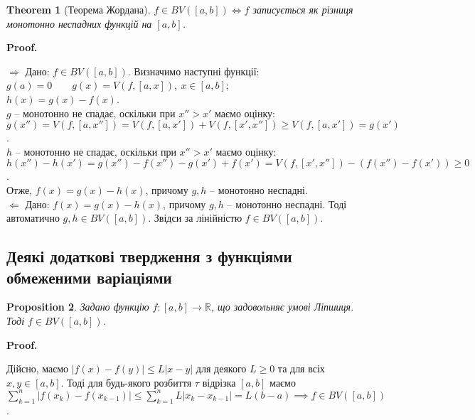 \documentclass[a4paper, 10pt]{article}
\makeatletter
\def\qed{$\blacksquare$}
\def\rightproof{$\boxed{\Rightarrow}$ }
\def\leftproof{$\boxed{\Leftarrow}$ }
\theoremstyle{theoremdd}
\newtheorem{theorem}{Theorem}[subsection]
\theoremstyle{theoremdd}
\theoremstyle{theoremdd}
\theoremstyle{theoremdd}
\theoremstyle{theoremdd}
\newtheorem{example}[theorem]{Example}
\theoremstyle{theoremdd}
\newtheorem{proposition}[theorem]{Proposition}
\theoremstyle{theoremdd}
\theoremstyle{theoremdd}
\theoremstyle{theoremdd}
\renewenvironment{proof}[1][Proof.\\]{\par
\pushQED{\hfill \qed}%
\normalfont \topsep6\p@\@plus6\p@\relax
\trivlist
\item\relax
{\bfseries
#1\@addpunct{.}}\hspace\labelsep\ignorespaces
}{%
\popQED\endtrivlist\@endpefalse
}
\makeatother
\begin{document}
\iffalse
\begin{example}
Розглянемо функцію $f(x) = x^\alpha \sin \dfrac{1}{x^\beta},\ f(0) = 0$, де $\alpha \in \mathbb{R},\beta > 0$. Дослідимо, чи буде $f \in BV([0,1])$.\\
Розглянемо $[\varepsilon,1]$ для кожного $0 < \varepsilon < 1$. Тоді зрозуміло, що існує похідна $f' \in C([\varepsilon,1])$. Це означає, що можна записати $\displaystyle\int_\varepsilon^1 f'(x)\,dx = f(1) - f(\varepsilon)$.
\end{example}
\fi

\begin{theorem}[Теорема Жордана]
$f \in BV([a,b]) \iff f$ записується як різниця монотонно неспадних функцій на $[a,b]$.
\end{theorem}

\begin{proof}
\rightproof Дано: $f \in BV([a,b])$. Визначимо наступні функції:\\
$g(a) = 0 \qquad g(x) =V(f,[a,x]),\ x \in [a,b]$;\\
$h(x) = g(x) - f(x)$.\\
$g$ -- монотонно не спадає, оскільки при $x'' > x'$ маємо оцінку: \\
$g(x'') = V(f,[a,x'']) = V(f,[a,x']) + V(f,[x',x'']) \geq V(f,[a,x']) = g(x')$.\\
$h$ -- монотонно не спадає, оскільки при $x'' > x'$ маємо оцінку:\\
$h(x'') - h(x') = g(x'') - f(x'') - g(x') + f(x') = V(f,[x',x'']) - (f(x'') - f(x')) \geq 0$.\\
Отже, $f(x) =  g(x) - h(x)$, причому $g,h$ -- монотонно неспадні.
\bigskip \\
\leftproof Дано: $f(x) = g(x) - h(x)$, причому $g,h$ -- монотонно неспадні. Тоді автоматично $g,h \in BV([a,b])$. Звідси за лінійністю $f \in BV([a,b])$.
\end{proof}

\subsection{Деякі додаткові твердження з функціями обмеженими варіаціями}
\begin{proposition}
Задано функцію $f \colon [a,b] \to \mathbb{R}$, що задовольняє умові Ліпшиця. Тоді $f \in BV([a,b])$.
\end{proposition}

\begin{proof}
Дійсно, маємо $|f(x) - f(y)| \leq L|x-y|$ для деякого $L \geq 0$ та для всіх $x,y \in [a,b]$. Тоді для будь-якого розбиття $\tau$ відрізка $[a,b]$ маємо\\
$\displaystyle\sum_{k=1}^n |f(x_k) - f(x_{k-1})| \leq \sum_{k=1}^n L |x_k - x_{k-1}| = L (b-a) \implies f \in BV([a,b])$.
\end{proof}
\end{document}
